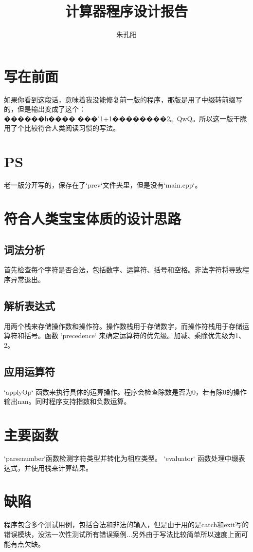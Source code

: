 ﻿\documentclass[12pt]{article}
\title{计算器程序设计报告}
\author{朱孔阳}
\begin{document}
\maketitle

\section{写在前面}
如果你看到这段话，意味着我没能修复前一版的程序，那版是用了中缀转前缀写的，但是输出变成了这个：������һ����׺���ʽ1+1��������2。QwQ。所以这一版干脆用了个比较符合人类阅读习惯的写法。
\section{PS}
老一版分开写的，保存在了`prev`文件夹里，但是没有`main.cpp`。

\section{符合人类宝宝体质的设计思路}
\subsection{词法分析}
首先检查每个字符是否合法，包括数字、运算符、括号和空格。非法字符将导致程序异常退出。

\subsection{解析表达式}
用两个栈来存储操作数和操作符。操作数栈用于存储数字，而操作符栈用于存储运算符和括号。函数 `precedence` 来确定运算符的优先级。加减、乘除优先级为1、2。

\subsection{应用运算符}
 `applyOp` 函数来执行具体的运算操作。程序会检查除数是否为0，若有除0的操作输出nan。同时程序支持指数和负数运算。

\section{主要函数}
`parsenumber`函数检测字符类型并转化为相应类型。 `evaluator` 函数处理中缀表达式，并使用栈来计算结果。

\section{缺陷}
程序包含多个测试用例，包括合法和非法的输入，但是由于用的是catch和exit写的错误模块，没法一次性测试所有错误案例...另外由于写法比较简单所以速度上面可能有点欠缺。
\end{document}
